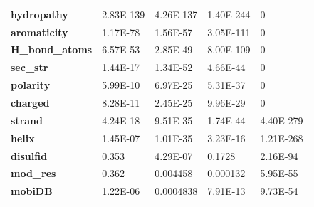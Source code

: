 \begin{table}[]
\begin{tabular}{@{}lllll@{}}
\textbf{hydropathy}           & 2.83E-139                              & 4.26E-137                                & 1.40E-244                              & 0                                      \\
\textbf{aromaticity}          & 1.17E-78                               & 1.56E-57                                 & 3.05E-111                              & 0                                      \\
\textbf{H\_bond\_atoms}       & 6.57E-53                               & 2.85E-49                                 & 8.00E-109                              & 0                                      \\
\textbf{sec\_str}             & 1.44E-17                               & 1.34E-52                                 & 4.66E-44                               & 0                                      \\
\textbf{polarity}             & 5.99E-10                               & 6.97E-25                                 & 5.31E-37                               & 0                                      \\
\textbf{charged}              & 8.28E-11                               & 2.45E-25                                 & 9.96E-29                               & 0                                      \\
\textbf{strand}               & 4.24E-18                               & 9.51E-35                                 & 1.74E-44                               & 4.40E-279                              \\
\textbf{helix}                & 1.45E-07                               & 1.01E-35                                 & 3.23E-16                               & 1.21E-268                              \\
\textbf{disulfid}             & \cellcolor[HTML]{F54D4D}0.353          & 4.29E-07                                 & \cellcolor[HTML]{F54D4D}0.1728         & 2.16E-94                               \\
\textbf{mod\_res}             & \cellcolor[HTML]{F54D4D}0.362          & 0.004458                                 & 0.000132                               & 5.95E-55                               \\
\textbf{mobiDB}               & 1.22E-06                               & 0.0004838                                & 7.91E-13                               & 9.73E-54                               \\

\end{tabular}
\end{table}
